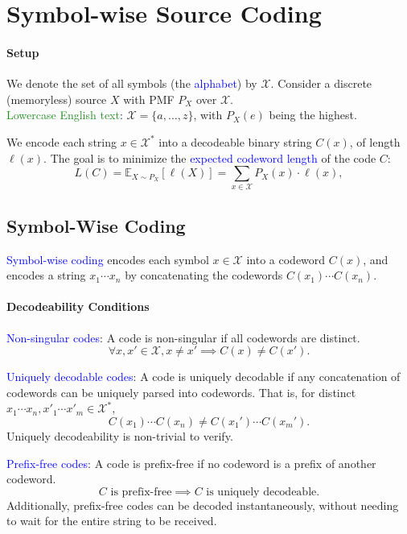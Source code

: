 \section{Symbol-wise Source Coding}
\paragraph{Setup}
We denote the set of all symbols (the \textcolor{Blue}{alphabet}) by
$\mathcal{X}$. Consider a discrete (memoryless) source $X$ with PMF $P_X$ over
$\mathcal{X}$.\\
{\textcolor{ForestGreen}{Lowercase English text}}:
$\mathcal{X}=\{a,\ldots,z\}$, with $P_X(e)$ being the highest.

We encode each string $x\in \mathcal{X}^{*}$ into a decodeable binary string
$C(x)$, of length $\ell(x)$. The goal is to minimize the
\textcolor{Blue}{expected codeword length} of the code $C$:
\[L(C)=\mathbb{E}_{X\sim P_X}\left[ \ell\left(X\right) \right]=\sum_{x\in\mathcal{X}} P_X(x)\cdot\ell\left(x\right),\]
\vspace{-4mm}
\subsection{Symbol-Wise Coding}
\textcolor{Blue}{Symbol-wise coding} encodes \textcolor{Bittersweet}{each
symbol} $x\in\mathcal{X}$ into a codeword $C(x)$, and
\textcolor{Bittersweet}{encodes a string} $x_1\cdots x_n$ by concatenating the
codewords $C(x_1)\cdots C(x_n)$.

\paragraph{Decodeability Conditions}
\textcolor{Blue}{Non-singular codes}: A code is non-singular if all codewords
are distinct.
\[\forall x,x'\in \mathcal{X}, x\neq x' \implies C(x)\neq C(x').\] 

\textcolor{Blue}{Uniquely decodable codes}: A code is uniquely decodable if any
concatenation of codewords can be uniquely parsed into codewords. That is, for
distinct $x_1\cdots x_n,x'_1\cdots x'_m\in \mathcal{X}^{*}$,
\[C(x_1)\cdots C(x_{n})\neq C(x_1')\cdots C(x_m').\]
Uniquely decodeability is \textcolor{Bittersweet}{non-trivial to verify}.

\textcolor{Blue}{Prefix-free codes}: A code is
prefix-free if no codeword is a prefix of another codeword.
\[C\text{ is prefix-free}\implies C\text{ is uniquely decodeable}.\]
Additionally, prefix-free codes can be decoded
\textcolor{Bittersweet}{instantaneously}, without needing to wait for the
entire string to be received.

